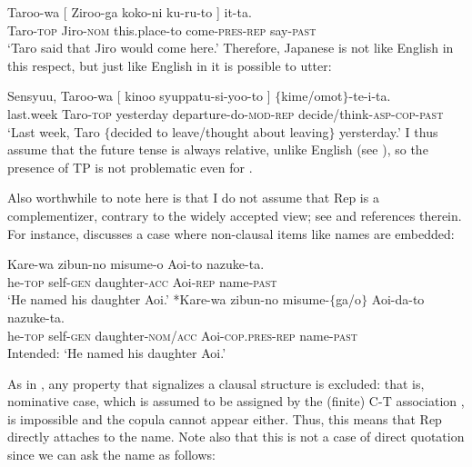 \documentclass[output=paper]{langsci/langscibook}
\begin{document}
\ea\label{shimamu23}
\gll Taroo-wa [ Ziroo-ga koko-ni ku-ru-to ] it-ta.\\
Taro-\textsc{top} {} Jiro-\textsc{nom} this.place-to come-\textsc{pres-rep} {} say-\textsc{past}\\
\glt `Taro said that Jiro would come here.' 
\z
Therefore, Japanese is not like English in this respect, but just like English in  it is possible to utter:

\ea\label{shimamu24} \gll Sensyuu, Taroo-wa [ kinoo syuppatu-si-yoo-to ] $\{$kime/omot$\}$-te-i-ta.\\
last.week Taro-\textsc{top} {} yesterday departure-do-\textsc{mod-rep} {} \phantom{$\{$}decide/think-\textsc{asp-cop-past}\\
\glt `Last week, Taro $\{$decided to leave/thought about leaving$\}$ yersterday.'
\z
I thus assume that the future tense is always relative, unlike English (see \citealt{ogihara1995}), so the presence of TP is not problematic even for .

Also worthwhile to note here is that I do not assume that Rep is a complementizer, contrary to the widely accepted view; see \citet{shimamura2018} and references therein. For instance, \citeauthor{shimamura2018} discusses a case where non-clausal items like names are embedded:

\ea\label{shimamu24.5} \begin{xlist}
 \ex \gll Kare-wa zibun-no misume-o Aoi-to nazuke-ta.\\
he-\textsc{top} self-\textsc{gen} daughter-\textsc{acc} Aoi-\textsc{rep} name-\textsc{past}\\
\glt `He named his daughter Aoi.'
\ex\label{shimamu24.5b}  \hspace{-1.5mm}*{\gll Kare-wa zibun-no misume-$\{$ga/o$\}$ Aoi-da-to nazuke-ta.\\
he-\textsc{top} self-\textsc{gen} daughter-\textsc{nom/acc} Aoi-\textsc{cop.pres-rep} name-\textsc{past}\\
\glt  Intended: `He named his daughter Aoi.'}
\end{xlist}
\z
As in , any property that signalizes a clausal structure is excluded: that is, nominative case, which is assumed to be assigned by the (finite) C-T association \citep{chomsky2008}, is impossible and the copula cannot appear either. Thus, this means that Rep directly attaches to the name. Note also that this is not a case of direct quotation since we can ask the name as follows:
\end{document}
